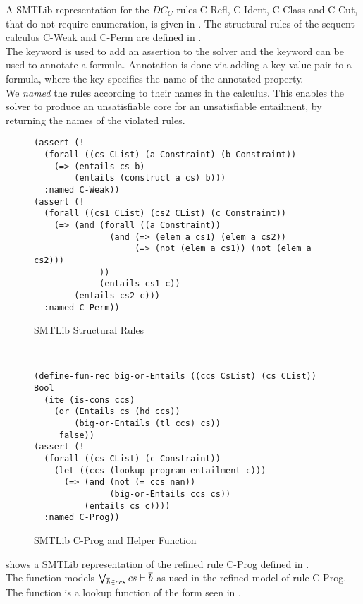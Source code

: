 A SMTLib representation for the $DC_C$ rules C-Refl,
C-Ident, C-Class and \mbox{C-Cut}, that do not
require enumeration, is given in .
The structural rules of the sequent calculus C-Weak and C-Perm
are defined in .\\
The keyword  is used to add an assertion
to the solver and the keyword \smtlib{!} can be used to
annotate a formula.
Annotation is done via adding a key-value pair to a formula,
where the key specifies the name of the annotated property.\\
We \textit{named} the rules according to their names in the calculus.
This enables the solver to produce an unsatisfiable core
for an unsatisfiable entailment,
by returning the names of the violated rules.
%
\begin{figure}[h]
\begin{lstlisting}[language=smtlib]
(assert (!
  (forall ((cs CList) (a Constraint) (b Constraint))
    (=> (entails cs b)
        (entails (construct a cs) b)))
  :named C-Weak))
(assert (!
  (forall ((cs1 CList) (cs2 CList) (c Constraint))
    (=> (and (forall ((a Constraint))
               (and (=> (elem a cs1) (elem a cs2))
                    (=> (not (elem a cs1)) (not (elem a cs2)))
             ))
             (entails cs1 c))
        (entails cs2 c)))
  :named C-Perm))
\end{lstlisting}
\caption{SMTLib Structural Rules}
\label{fig:smtlib-structural-rules}
\end{figure}\\
%
\begin{figure}[t]
\begin{lstlisting}[language=smtlib]
(define-fun-rec big-or-Entails ((ccs CsList) (cs CList)) Bool
  (ite (is-cons ccs)
    (or (Entails cs (hd ccs))
        (big-or-Entails (tl ccs) cs))
     false))
(assert (!
  (forall ((cs CList) (c Constraint))
    (let ((ccs (lookup-program-entailment c)))
      (=> (and (not (= ccs nan))
               (big-or-Entails ccs cs))
          (entails cs c))))
  :named C-Prog))
\end{lstlisting}
\caption{SMTLib C-Prog and Helper Function}
\label{fig:smtlib-cprog}
\end{figure}
%
 shows a SMTLib representation
of the refined rule C-Prog defined in .\\
The function  models
$\bigvee_{\overline{b} \in ccs}{cs \vdash \overline{b}}$
as used in the refined model of rule C-Prog.
The function  is a lookup
function of the form seen in .

